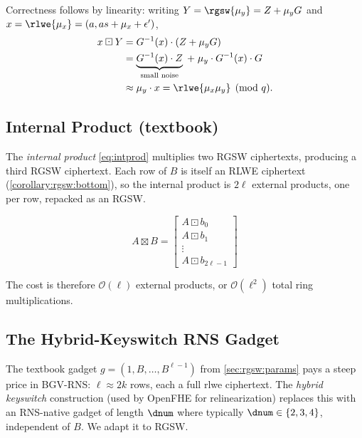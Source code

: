 \ifclaude
Correctness follows by linearity: writing $Y = \rgsw{\mu_y} = Z + \mu_y G$ and $x = \rlwe{\mu_x} = (a, as + \mu_x + \epsilon')$,
\begin{align}
    x \boxdot Y &= G^{-1}(x) \cdot (Z + \mu_y G) \\
                &= \underbrace{G^{-1}(x) \cdot Z}_{\text{small noise}} \;+\; \mu_y \cdot G^{-1}(x) \cdot G \\
                &\approx \mu_y \cdot x = \rlwe{\mu_x \mu_y} \pmod{q}.
\end{align}
\fi

\subsection{Internal Product (textbook)}
\label{sec:rgsw:intprod}

The \emph{internal product} \eqref{eq:intprod} multiplies two RGSW ciphertexts, producing a third RGSW ciphertext. Each row of $B$ is itself an RLWE ciphertext (\autoref{corollary:rgsw:bottom}), so the internal product is $2\ell$ external products, one per row, repacked as an RGSW.

\begin{equation}
    \label{eq:intprod}
    A \boxtimes B =
    \begin{bmatrix}
        A \boxdot b_0 \\
        A \boxdot b_1 \\
        \vdots \\
        A \boxdot b_{2\ell - 1}
    \end{bmatrix}
\end{equation}

\ifclaude
The cost is therefore $\mathcal{O}(\ell)$ external products, or $\mathcal{O}(\ell^2)$ total ring multiplications.
\fi

\ifnotes
\newpage
\subsection{The Hybrid-Keyswitch RNS Gadget}
\label{sec:rgsw:hybrid}

The textbook gadget $g = (1, B, \dots, B^{\ell-1})$ from \autoref{sec:rgsw:params} pays a steep price in BGV-RNS: $\ell \approx 2k$ rows, each a full \gls{rlwe} ciphertext. The \emph{hybrid keyswitch} construction (used by OpenFHE for relinearization) replaces this with an RNS-native gadget of length $\dnum$ where typically $\dnum \in \{2, 3, 4\}$, independent of $B$. We adapt it to RGSW.

